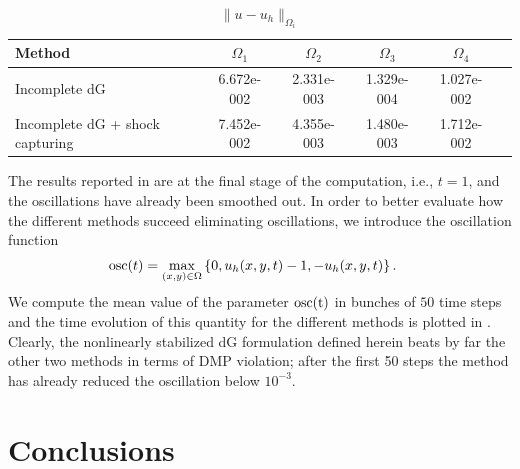 \begin{table}
\centering
\begin{tabular}{lccccc}
\hline
Method &  $\Omega_1$ &  $\Omega_2$ &  $\Omega_3$ &  $\Omega_4$\\\hline
Incomplete dG &  6.672e-002 & 2.331e-003 & 1.329e-004 &   1.027e-002\\
Incomplete dG + shock capturing &   7.452e-002 & 4.355e-003 & 1.480e-003 & 1.712e-002\\
\hline
\end{tabular}
\caption{ $\|u-u_h\|_{\Omega_i}$}\label{tab-ex15_malla2D_new}
\end{table}
The results reported in  are at the final stage of the computation, i.e., $t=1$, and the oscillations have already been smoothed out. In order to better evaluate how the different methods succeed eliminating oscillations, we introduce the oscillation function
\begin{align*}
&{\rm osc}(t) = \max_{(x,y)\in \Omega} \left\{0 , u_h(x,y,t) - 1 , -u_h(x,y,t) \right\}.
\end{align*}
We compute the mean value of the parameter ${\rm osc(t)}$ in bunches of $50$ time steps and the time evolution of this quantity for the different methods is plotted in . Clearly, the nonlinearly stabilized dG formulation defined herein beats by far the other two methods in terms of DMP violation; after the first 50 steps the method has already reduced the oscillation below $10^{-3}$.  

\section{Conclusions}\label{s-concl}


